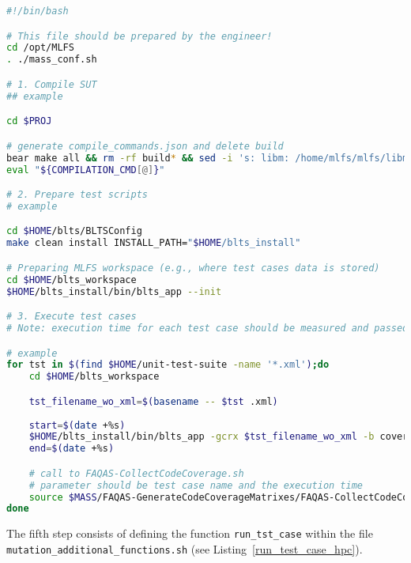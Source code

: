 \begin{lstlisting}[language=bash, label=preparesut_hpc ,caption=\MASS PrepareSUT.sh file.]
#!/bin/bash

# This file should be prepared by the engineer!
cd /opt/MLFS
. ./mass_conf.sh

# 1. Compile SUT
## example

cd $PROJ

# generate compile_commands.json and delete build
bear make all && rm -rf build* && sed -i 's: libm: /home/mlfs/mlfs/libm:' compile_commands.json && mv compile_commands.json $MUTANTS_DIR
eval "${COMPILATION_CMD[@]}"

# 2. Prepare test scripts
# example

cd $HOME/blts/BLTSConfig
make clean install INSTALL_PATH="$HOME/blts_install"

# Preparing MLFS workspace (e.g., where test cases data is stored)
cd $HOME/blts_workspace
$HOME/blts_install/bin/blts_app --init

# 3. Execute test cases
# Note: execution time for each test case should be measured and passed as argument to FAQAS-CollectCodeCoverage.sh

# example
for tst in $(find $HOME/unit-test-suite -name '*.xml');do
    cd $HOME/blts_workspace

    tst_filename_wo_xml=$(basename -- $tst .xml)
    
    start=$(date +%s)
    $HOME/blts_install/bin/blts_app -gcrx $tst_filename_wo_xml -b coverage --nocsv -s $tst
    end=$(date +%s)    

    # call to FAQAS-CollectCodeCoverage.sh
    # parameter should be test case name and the execution time
    source $MASS/FAQAS-GenerateCodeCoverageMatrixes/FAQAS-CollectCodeCoverage.sh $tst_filename_wo_xml "$(($end-$start))" $PROJ_COV
done
\end{lstlisting}

The fifth step consists of defining the function \texttt{run\_tst\_case} within the file \\\texttt{mutation\_additional\_functions.sh} (see Listing~\ref{run_test_case_hpc}).

